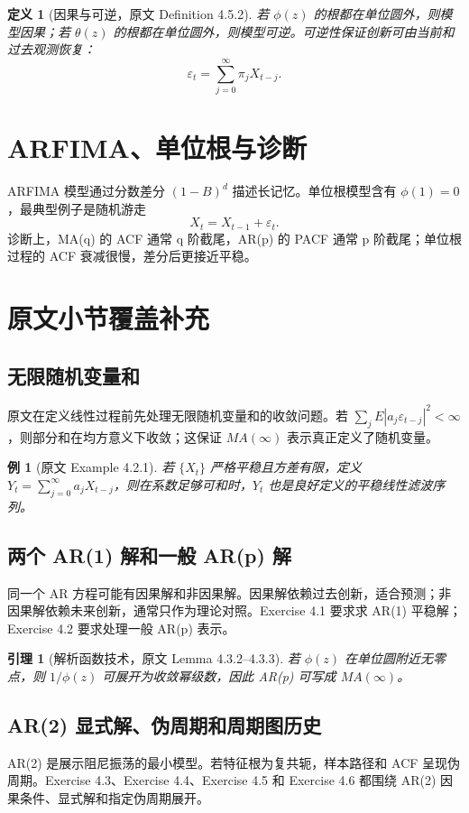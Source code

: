 \documentclass[11pt,a4paper]{ctexart}
\newtheorem{definition}{定义}[section]
\newtheorem{lemma}{引理}[section]
\newtheorem{example}{例}[section]
\begin{document}
\begin{definition}[因果与可逆，原文 Definition 4.5.2]
若 \(\phi(z)\) 的根都在单位圆外，则模型因果；若 \(\theta(z)\) 的根都在单位圆外，则模型可逆。可逆性保证创新可由当前和过去观测恢复：
\[
  \varepsilon_t=\sum_{j=0}^{\infty}\pi_j X_{t-j}.
\]
\end{definition}

\section{ARFIMA、单位根与诊断}

ARFIMA 模型通过分数差分 \((1-B)^d\) 描述长记忆。单位根模型含有 \(\phi(1)=0\)，最典型例子是随机游走
\[
  X_t=X_{t-1}+\varepsilon_t.
\]
诊断上，MA(q) 的 ACF 通常 q 阶截尾，AR(p) 的 PACF 通常 p 阶截尾；单位根过程的 ACF 衰减很慢，差分后更接近平稳。

\section{原文小节覆盖补充}

\subsection{无限随机变量和}
原文在定义线性过程前先处理无限随机变量和的收敛问题。若 \(\sum_jE|a_j\varepsilon_{t-j}|^2<\infty\)，则部分和在均方意义下收敛；这保证 \(MA(\infty)\) 表示真正定义了随机变量。

\begin{example}[原文 Example 4.2.1]
若 \(\{X_t\}\) 严格平稳且方差有限，定义 \(Y_t=\sum_{j=0}^{\infty}a_jX_{t-j}\)，则在系数足够可和时，\(Y_t\) 也是良好定义的平稳线性滤波序列。
\end{example}

\subsection{两个 AR(1) 解和一般 AR(p) 解}
同一个 AR 方程可能有因果解和非因果解。因果解依赖过去创新，适合预测；非因果解依赖未来创新，通常只作为理论对照。Exercise 4.1 要求求 AR(1) 平稳解；Exercise 4.2 要求处理一般 AR(p) 表示。

\begin{lemma}[解析函数技术，原文 Lemma 4.3.2--4.3.3]
若 \(\phi(z)\) 在单位圆附近无零点，则 \(1/\phi(z)\) 可展开为收敛幂级数，因此 AR(p) 可写成 \(MA(\infty)\)。
\end{lemma}

\subsection{AR(2) 显式解、伪周期和周期图历史}
AR(2) 是展示阻尼振荡的最小模型。若特征根为复共轭，样本路径和 ACF 呈现伪周期。Exercise 4.3、Exercise 4.4、Exercise 4.5 和 Exercise 4.6 都围绕 AR(2) 因果条件、显式解和指定伪周期展开。
\end{document}
